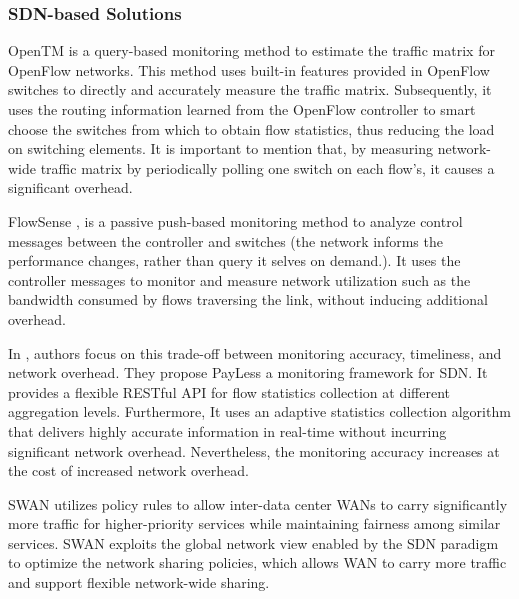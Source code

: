 
\subsubsection{SDN-based Solutions}

OpenTM \cite{Tootoonchian_2010:opentm} is a query-based monitoring method to estimate the traffic matrix for OpenFlow networks. This method uses built-in features provided in OpenFlow switches to directly and accurately measure the traffic matrix. Subsequently, it uses the routing information learned from the OpenFlow controller to smart choose the switches from which to obtain flow statistics, thus reducing the load on switching elements. It is important to mention that, by measuring network-wide traffic matrix by periodically polling one switch on each flow's, it causes a significant overhead.

FlowSense \cite{Yu_2013:flow_sense}, is a passive push-based monitoring method to analyze control messages between the controller and switches (the network informs the performance changes, rather than query it selves on demand.). It uses the controller messages to monitor and measure network utilization such as the bandwidth consumed by flows traversing the link, without inducing additional overhead. 

In \cite{chowdhury_2014:payless}, authors focus on this trade-off between monitoring accuracy, timeliness, and network overhead. They propose PayLess a monitoring framework for SDN. It provides a flexible RESTful API for flow statistics collection at different aggregation levels. Furthermore, It uses an adaptive statistics collection algorithm that delivers highly accurate information in real-time without incurring significant network overhead. Nevertheless, the monitoring accuracy increases at the cost of increased network overhead.

SWAN \cite{Hong_2013:AHU} utilizes policy rules to allow inter-data center WANs to carry significantly more traffic for higher-priority services while maintaining fairness among similar services. SWAN exploits the global network view enabled by the SDN paradigm to optimize the network sharing policies, which allows WAN to carry more traffic and support flexible network-wide sharing.

